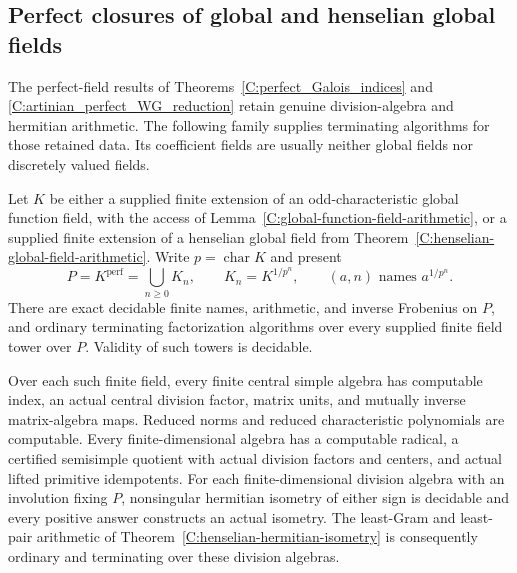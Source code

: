 \subsection{Perfect closures of global and henselian global fields}
\label{C:perfection-subsection}

The perfect-field results of
Theorems~\ref{C:perfect_Galois_indices} and
\ref{C:artinian_perfect_WG_reduction} retain genuine division-algebra
and hermitian arithmetic.  The following family supplies terminating
algorithms for those retained data.  Its coefficient fields are
usually neither global fields nor discretely valued fields.

\begin{theorem}
\label{C:perfection-field-arithmetic}
Let $K$ be either a supplied finite extension of an odd-characteristic
global function field, with the access of
Lemma~\ref{C:global-function-field-arithmetic}, or a supplied finite
extension of a henselian global field from
Theorem~\ref{C:henselian-global-field-arithmetic}.
Write $p=\operatorname{char}K$ and present
\[
 P=K^{\mathrm{perf}}=\bigcup_{n\ge0}K_n,
 \qquad K_n=K^{1/p^n},
 \qquad (a,n)\text{ names }a^{1/p^n}.                 \tag{C.3.PERF1}
\]
There are exact decidable finite names, arithmetic, and inverse
Frobenius on $P$, and ordinary terminating factorization algorithms
over every supplied finite field tower over $P$.  Validity of such
towers is decidable.

Over each such finite field, every finite central simple algebra has
computable index, an actual central division factor, matrix units,
and mutually inverse matrix-algebra maps.  Reduced norms and reduced
characteristic polynomials are computable.  Every finite-dimensional
algebra has a computable radical, a certified semisimple quotient with
actual division factors and centers, and actual lifted primitive
idempotents.  For each finite-dimensional division algebra with an
involution fixing $P$, nonsingular hermitian isometry of either sign
is decidable and every positive answer constructs an actual isometry.
The least-Gram and least-pair arithmetic of
Theorem~\ref{C:henselian-hermitian-isometry} is consequently ordinary
and terminating over these division algebras.
\end{theorem}
